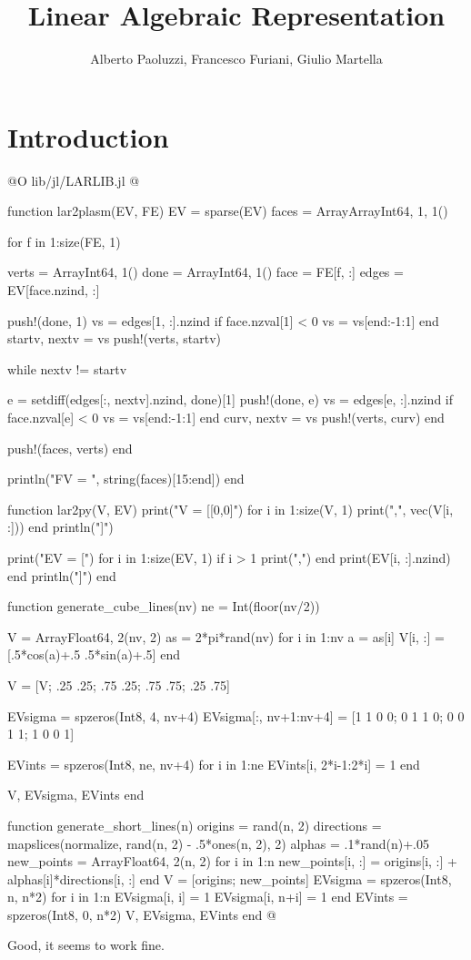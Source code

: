 \documentclass[10pt]{book}
\author{Alberto Paoluzzi, Francesco Furiani, Giulio Martella}
\title{Linear Algebraic Representation}
\begin{document}
\frontmatter
\maketitle
\tableofcontents

\mainmatter

\chapter{Introduction}

@O lib/jl/LARLIB.jl
@{function lar2plasm(EV, FE)
    EV = sparse(EV)
    faces = Array{Array{Int64, 1}, 1}()

    for f in 1:size(FE, 1)

        verts = Array{Int64, 1}()
        done = Array{Int64, 1}()
        face = FE[f, :]
        edges = EV[face.nzind, :]

        push!(done, 1)
        vs = edges[1, :].nzind
        if face.nzval[1] < 0
            vs = vs[end:-1:1]
        end
        startv, nextv = vs
        push!(verts, startv)

        while nextv != startv
            
            e = setdiff(edges[:, nextv].nzind, done)[1]
            push!(done, e)
            vs = edges[e, :].nzind
            if face.nzval[e] < 0
                vs = vs[end:-1:1]
            end
            curv, nextv = vs
            push!(verts, curv)
        end

        push!(faces, verts)
    end

    println("FV = ", string(faces)[15:end])
end

function lar2py(V, EV)
    print("V = [[0,0]")
    for i in 1:size(V, 1)
        print(",", vec(V[i, :]))
    end
    println("]")
    
    print("EV = [")
    for i in 1:size(EV, 1)
        if i > 1 print(",") end
        print(EV[i, :].nzind)
    end
    println("]")
end

function generate_cube_lines(nv)
    ne = Int(floor(nv/2))
    
    V = Array{Float64, 2}(nv, 2)
    as = 2*pi*rand(nv)
    for i in 1:nv
        a = as[i]
        V[i, :] = [.5*cos(a)+.5 .5*sin(a)+.5]
    end
    
    V = [V; .25 .25; .75 .25; .75 .75; .25 .75]
    

    EVsigma = spzeros(Int8, 4, nv+4)
    EVsigma[:, nv+1:nv+4] = [1 1 0 0; 0 1 1 0; 0 0 1 1; 1 0 0 1]

    EVints = spzeros(Int8, ne, nv+4)
    for i in 1:ne
        EVints[i, 2*i-1:2*i] = 1
    end
    
    V, EVsigma, EVints
end


function generate_short_lines(n)
    origins = rand(n, 2)
    directions = mapslices(normalize, rand(n, 2) - .5*ones(n, 2), 2)
    alphas = .1*rand(n)+.05
    new_points = Array{Float64, 2}(n, 2)
    for i in 1:n
        new_points[i, :] = origins[i, :] + alphas[i]*directions[i, :]
    end
    V = [origins; new_points]
    EVsigma = spzeros(Int8, n, n*2)
    for i in 1:n
        EVsigma[i, i] = 1
        EVsigma[i, n+i] = 1
    end
    EVints = spzeros(Int8, 0, n*2)
    V, EVsigma, EVints
end
@}


Good, it seems to work fine.


\backmatter


{}

\end{document}
